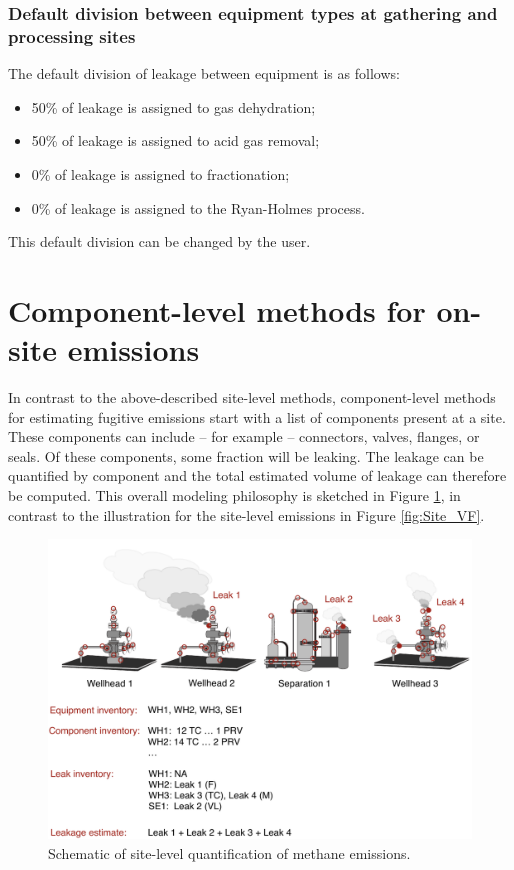 \documentclass[11pt]{report}
\begin{document}
{{{{\subsubsection{Default division between equipment types at gathering and processing sites}

The default division of leakage between equipment is as follows:
\begin{itemize}
\item 50\% of leakage is assigned to gas dehydration;
\item 50\% of leakage is assigned to acid gas removal;
\item 0\% of leakage is assigned to fractionation;
\item 0\% of leakage is assigned to the Ryan-Holmes process. 
\end{itemize}

This default division can be changed by the user.

\section{Component-level methods for on-site emissions}

In contrast to the above-described site-level methods, component-level methods for estimating fugitive emissions start with a list of components present at a site. These components can include -- for example -- connectors, valves, flanges, or seals. Of these components, some fraction will be leaking. The leakage can be quantified by component and the total estimated volume of leakage can therefore be computed. This overall modeling philosophy is sketched in Figure \ref{fig:Component_VF}, in contrast to the illustration for the site-level emissions in Figure \ref{fig:Site_VF}.

\begin{figure}[t]
\includegraphics[width=1\columnwidth]{images/Component_VF.pdf}
\caption{Schematic of site-level quantification of methane emissions.}
\label{fig:Component_VF}
\end{figure}

}}}}
\end{document}
